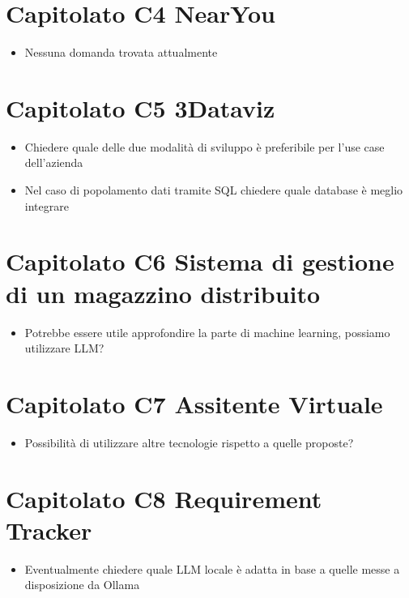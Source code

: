 \documentclass[10pt]{article}
\begin{document}
    \section{\textbf{Capitolato C4 NearYou}}
    \begin{itemize}
        \item Nessuna domanda trovata attualmente
    \end{itemize}

    \section{\textbf{Capitolato C5 3Dataviz}}
    \begin{itemize}
        \item Chiedere quale delle due modalità di sviluppo è preferibile per l'use case dell'azienda
        \item Nel caso di popolamento dati tramite SQL chiedere quale database è meglio integrare
    \end{itemize}

    \section{\textbf{Capitolato C6 Sistema di gestione di un magazzino distribuito}}
    \begin{itemize}
        \item Potrebbe essere utile approfondire la parte di machine learning, possiamo utilizzare LLM? 
    \end{itemize}

    \section{\textbf{Capitolato C7 Assitente Virtuale}}
    \begin{itemize}
        \item Possibilità di utilizzare altre tecnologie rispetto a quelle proposte? 
    \end{itemize}

    \section{\textbf{Capitolato C8 Requirement Tracker}}
    \begin{itemize}
        \item Eventualmente chiedere quale LLM locale è adatta in base a quelle messe a disposizione da Ollama
    \end{itemize}
\end{document}
